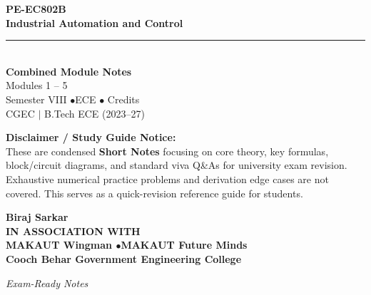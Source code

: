 \documentclass[12pt,a4paper]{article}
\begin{document}
\thispagestyle{empty}


\vspace*{1.0cm}
\begin{center}
  {\Huge\bfseries\color{myred} PE-EC802B}\\[10pt]
  {\LARGE\bfseries\color{mydark} Industrial Automation and Control}\\[20pt]
  {\color{myred}\rule{0.7\linewidth}{1.5pt}}\\[18pt]
  {\Large\color{myteal}\textbf{Combined Module Notes}}\\[8pt]
  {\large\color{mydark} Modules 1 -- 5}\\[40pt]
  {\normalsize\color{mydark} Semester VIII \quad$\bullet$\quad ECE \quad$\bullet$ Credits}\\[12pt]
  {\normalsize\color{mydark} CGEC \;$|$\; B.Tech ECE (2023--27)}
\end{center}
\vspace{1.0cm}
\begin{center}
  \begin{tcolorbox}[colback=mygray, colframe=mgframe, boxrule=0.5pt, arc=3pt, width=0.85\linewidth]
    \centering\small\color{mydark}
    \textbf{Disclaimer / Study Guide Notice:}\\
    These are condensed \textbf{Short Notes} focusing on core theory, key formulas, block/circuit diagrams, and standard viva Q\&As for university exam revision. Exhaustive numerical practice problems and derivation edge cases are not covered. This serves as a quick-revision reference guide for students.
  \end{tcolorbox}
\end{center}
\vfill
\vspace{0.6cm}
\begin{center}
  {\large\bfseries\color{mypurple} Biraj Sarkar}\\[16pt]
  {\footnotesize\color{watermark}\textbf{IN ASSOCIATION WITH}}\\[8pt]
  {\small\bfseries\color{mydark} MAKAUT Wingman \quad$\bullet$\quad MAKAUT Future Minds}\\[12pt]
  {\large\bfseries\color{myteal} Cooch Behar Government Engineering College}
\end{center}
\vfill
\begin{center}{\small\color{watermark}\textit{Exam-Ready Notes}}\end{center}
\clearpage
\end{document}
